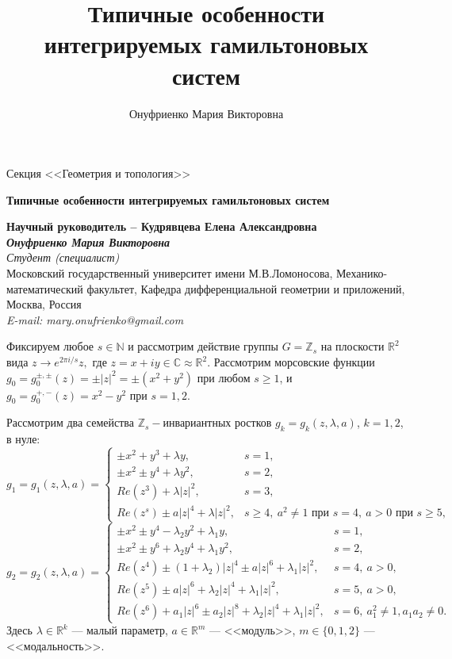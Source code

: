\documentclass[a4paper, 12pt, oneside]{ncc}
\title{ Типичные особенности интегрируемых гамильтоновых систем }
\author{ Онуфриенко Мария Викторовна }
\begin{document}
\begin{flushright}
Секция <<Геометрия и топология>>
\end{flushright}

\begin{center}
\textbf{Типичные особенности интегрируемых гамильтоновых систем}
\end{center}

\begin{center}
\textbf{Научный руководитель -- Кудрявцева Елена Александровна  }\\
\vspace{0.2cm}
\textbf{\textit{Онуфриенко Мария Викторовна}}\\
\textit{Студент (специалист)}\\
Московский государственный университет имени М.В.Ломоносова, Механико-математический факультет, Кафедра дифференциальной геометрии и приложений, Москва, Россия\\
\textit{E-mail: mary.onufrienko@gmail.com}
\\
\end{center}

Фиксируем любое $s\in\mathbb N$ и рассмотрим действие группы $G=\mathbb{Z}_s$ на плоскости $\mathbb{R}^2$ вида 
$z\longrightarrow e^{2\pi i/{s}}z,$ где $z=x+iy\in\mathbb C\approx\mathbb{R}^2.$
Рассмотрим морсовские функции $g_0=g_0^{\pm,\pm}(z)=\pm|z|^2=\pm (x^2+y^2)$ при любом $s\ge1$, и $g_0=g_0^{+,-}(z)=x^2-y^2$ при $s=1,2$. 

Рассмотрим два семейства $\mathbb{Z}_s-$инвариантных ростков $g_k=g_k(z,\lambda,a)$, $k=1,2$, в нуле:
$$
g_1=g_1(z,\lambda,a)=\left\{
\begin{array}{ll}
\pm x^2+y^3+\lambda y, & s=1, \\
\pm x^2\pm y^4 +\lambda y^2, & s=2, \\
Re(z^3)+\lambda|z|^2, & s=3, \\
Re(z^s)\pm a|z|^4+\lambda |z|^2, & s\ge4,\ a^2\neq 1 \mbox{ при }s=4,\ a>0 \mbox{ при }s\ge5,
\end{array}
\right.
$$
$$
g_2=g_2(z,\lambda,a)=\left\{
\begin{array}{ll}
\pm x^2\pm y^4-\lambda_2 y^2+\lambda_1 y, & s=1, \\
\pm x^2\pm y^6 +\lambda_2 y^4+\lambda_1 y^2, & s=2, \\
Re(z^4)\pm(1+\lambda_2)|z|^4 \pm a|z|^6+\lambda_1 |z|^2, & s=4,\ a>0, \\
Re(z^5)\pm a|z|^6+\lambda_2|z|^4+\lambda_1 |z|^2, & s=5,\ a>0, \\
Re(z^6)+a_1 |z|^6\pm a_2 |z|^8+\lambda_2|z|^4+\lambda_1 |z|^2, & s=6,\ a_1^2\ne1, a_1a_2\ne0.
\end{array}
\right.
$$
Здесь $\lambda\in\mathbb{R}^k$ --- малый параметр, $a\in\mathbb{R}^m$ --- <<модуль>>, $m\in\{0,1,2\}$ --- <<модальность>>.
\end{document}
